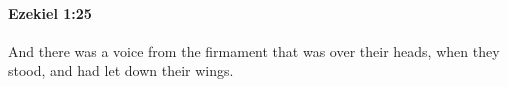 
		\paragraph{Ezekiel 1:25} %
			\label{EZEKIEL-1-25}

			And there was a voice from the firmament that was over their heads, when they stood, and had let down their wings.


